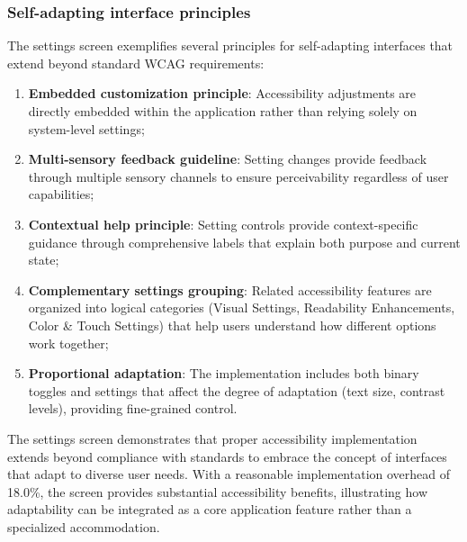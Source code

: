 \subsubsection{Self-adapting interface principles}
\label{subsubsec:settings-self-adapting-principles}

The settings screen exemplifies several principles for self-adapting interfaces that extend beyond standard WCAG requirements:

\begin{enumerate}
    \item \textbf{Embedded customization principle}: Accessibility adjustments are directly embedded within the application rather than relying solely on system-level settings;
    
    \item \textbf{Multi-sensory feedback guideline}: Setting changes provide feedback through multiple sensory channels to ensure perceivability regardless of user capabilities;
    
    \item \textbf{Contextual help principle}: Setting controls provide context-specific guidance through comprehensive labels that explain both purpose and current state;
    
    \item \textbf{Complementary settings grouping}: Related accessibility features are organized into logical categories (Visual Settings, Readability Enhancements, Color \& Touch Settings) that help users understand how different options work together;
    
    \item \textbf{Proportional adaptation}: The implementation includes both binary toggles and settings that affect the degree of adaptation (text size, contrast levels), providing fine-grained control.
\end{enumerate}

The settings screen demonstrates that proper accessibility implementation extends beyond compliance with standards to embrace the concept of interfaces that adapt to diverse user needs. With a reasonable implementation overhead of 18.0\%, the screen provides substantial accessibility benefits, illustrating how adaptability can be integrated as a core application feature rather than a specialized accommodation.

\newpage

